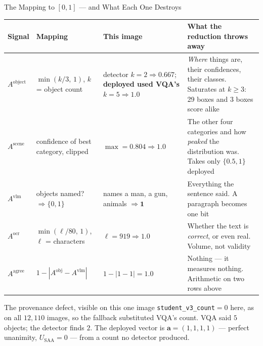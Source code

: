 \documentclass[aspectratio=169,11pt]{beamer}
\begin{document}
\begin{frame}{The Mapping to $[0,1]$ --- and What Each One Destroys}
\scriptsize
\begin{center}
\tiny
\renewcommand{\arraystretch}{0.95}
\begin{tabular}{@{}p{1.3cm} p{3.0cm} p{3.0cm} p{4.7cm}@{}}
\toprule
\textbf{Signal} & \textbf{Mapping} & \textbf{This image} & \textbf{What the reduction throws away} \\
\midrule
$A^{\text{object}}$ & $\min(k/3,\,1)$, $k$ = object count &
detector $k{=}2 \Rightarrow 0.667$; \textbf{deployed used VQA's $k{=}5 \Rightarrow 1.0$} &
\emph{Where} things are, their confidences, their classes. Saturates at $k\!\ge\!3$: 29 boxes and 3 boxes score alike \\
\addlinespace
$A^{\text{scene}}$ & confidence of best category, clipped &
$\max = 0.804 \Rightarrow \mathbf{1.0}$ &
The other four categories and how \emph{peaked} the distribution was. Takes only $\{0.5,1\}$ deployed \\
\addlinespace
$A^{\text{vlm}}$ & objects named? $\Rightarrow \{0,1\}$ &
names a man, a gun, animals $\Rightarrow \mathbf{1}$ &
Everything the sentence said. A paragraph becomes one bit \\
\addlinespace
$A^{\text{ocr}}$ & $\min(\ell/80,\,1)$, $\ell$ = characters &
$\ell{=}919 \Rightarrow \mathbf{1.0}$ &
Whether the text is \emph{correct}, or even real. Volume, not validity \\
\addlinespace
$A^{\text{agree}}$ & $1-|A^{\text{obj}}-A^{\text{vlm}}|$ &
$1-|1-1| = \mathbf{1.0}$ &
Nothing --- it measures nothing. Arithmetic on two rows above \\
\bottomrule
\end{tabular}
\end{center}
\vspace{-1mm}
\begin{alertblock}{\scriptsize The provenance defect, visible on this one image}
\scriptsize \texttt{student\_v3\_count}$=0$ here, as on all $12{,}110$ images, so the fallback substituted VQA's count. VQA said $5$ objects; the detector finds $2$. The deployed vector is $\mathbf{a}=(1,1,1,1)$ --- perfect unanimity, $U_{\text{SAA}}=0$ --- from a count no detector produced.
\end{alertblock}
\end{frame}
\end{document}
